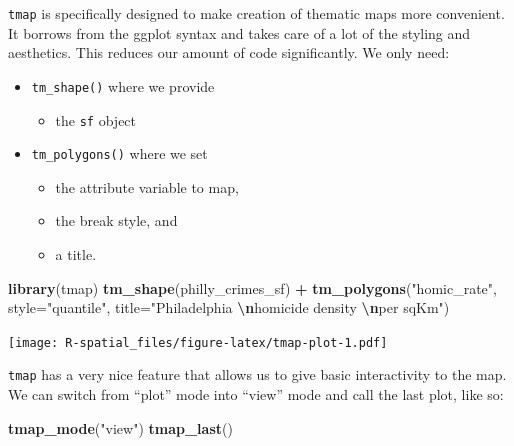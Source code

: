 \documentclass[
]{book}
\newenvironment{Shaded}{\begin{snugshade}}{\end{snugshade}}
\newcommand{\AttributeTok}[1]{\textcolor[rgb]{0.13,0.29,0.53}{#1}}
\newcommand{\FunctionTok}[1]{\textcolor[rgb]{0.13,0.29,0.53}{\textbf{#1}}}
\newcommand{\NormalTok}[1]{#1}
\newcommand{\SpecialCharTok}[1]{\textcolor[rgb]{0.81,0.36,0.00}{\textbf{#1}}}
\newcommand{\StringTok}[1]{\textcolor[rgb]{0.31,0.60,0.02}{#1}}
\providecommand{\tightlist}{%
  \setlength{\itemsep}{0pt}\setlength{\parskip}{0pt}}
\begin{document}
\texttt{tmap} is specifically designed to make creation of thematic maps more convenient. It borrows from the ggplot syntax and takes care of a lot of the styling and aesthetics. This reduces our amount of code significantly. We only need:

\begin{itemize}
\tightlist
\item
  \texttt{tm\_shape()} where we provide

  \begin{itemize}
  \tightlist
  \item
    the \texttt{sf} object
  \end{itemize}
\item
  \texttt{tm\_polygons()} where we set

  \begin{itemize}
  \tightlist
  \item
    the attribute variable to map,
  \item
    the break style, and
  \item
    a title.
  \end{itemize}
\end{itemize}

\begin{Shaded}
\begin{Highlighting}[]
\FunctionTok{library}\NormalTok{(tmap)}
\FunctionTok{tm\_shape}\NormalTok{(philly\_crimes\_sf) }\SpecialCharTok{+}
  \FunctionTok{tm\_polygons}\NormalTok{(}\StringTok{"homic\_rate"}\NormalTok{, }
              \AttributeTok{style=}\StringTok{"quantile"}\NormalTok{, }
              \AttributeTok{title=}\StringTok{"Philadelphia }\SpecialCharTok{\textbackslash{}n}\StringTok{homicide density }\SpecialCharTok{\textbackslash{}n}\StringTok{per sqKm"}\NormalTok{)}
\end{Highlighting}
\end{Shaded}

\texttt{[image: R-spatial\_files/figure-latex/tmap-plot-1.pdf]}

\texttt{tmap} has a very nice feature that allows us to give basic interactivity to the map. We can switch from ``plot'' mode into ``view'' mode and call the last plot, like so:

\begin{Shaded}
\begin{Highlighting}[]
\FunctionTok{tmap\_mode}\NormalTok{(}\StringTok{"view"}\NormalTok{)}
\FunctionTok{tmap\_last}\NormalTok{()}
\end{Highlighting}
\end{Shaded}
\end{document}
